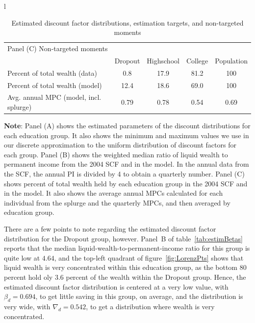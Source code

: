 \documentclass[\econtexRoot/EGMN]{subfiles}
\begin{document}
\begin{table}[tp]
\begin{center}
\begin{tabular}{l}
            \begin{tabular}{lcccc}
                \multicolumn{5}{l}{Panel (C) Non-targeted moments}                                   \\
                                                       & Dropout & Highschool & College & Population \\ \midrule
                Percent of total wealth (data)         & 0.8     & 17.9       & 81.2    & 100        \\
                Percent of total wealth (model)        & 12.4    & 18.6       & 69.0    & 100        \\
                Avg. annual MPC (model, incl. splurge) & 0.79    & 0.78       & 0.54    & 0.69
                \\ \bottomrule
            \end{tabular}
        \end{tabular}
        \caption{Estimated discount factor distributions, estimation targets, and non-targeted moments}
        \notinsubfile{\label{tab:estimBetas}}
        \parbox{16cm}{\small \vspace{.15cm} \textbf{Note}: Panel (A) shows the estimated parameters of the discount distributions for each education group. It also shows the minimum and maximum values we use in our discrete approximation to the uniform distribution of discount factors for each group. Panel (B) shows the weighted median ratio of liquid wealth to permanent income from the 2004 SCF and in the model. In the annual data from the SCF, the annual PI is divided by 4 to obtain a quarterly number. Panel (C) shows percent of total wealth held by each education group in the 2004 SCF and in the model. It also shows the average annual MPCs calculated for each individual from the splurge and the quarterly MPCs, and then averaged by education group.\normalsize}
    \end{center}
\end{table}

There are a few points to note regarding the estimated discount factor distribution for the Dropout group, however. Panel~B of table~\ref{tab:estimBetas} reports that the median liquid-wealth-to-permanent-income ratio for this group is quite low at $4.64$, and the top-left quadrant of figure~\ref{fig:LorenzPts} shows that liquid wealth is very concentrated within this education group, as the bottom 80 percent  hold oly $3.6$ percent of the wealth within the Dropout group. Hence, the estimated discount factor distribution is centered at a very low value, with $\beta_d=0.694$, to get little saving in this group, on average, and the distribution is very wide, with $\nabla_d=0.542$, to get a distribution where wealth is very concentrated.
\end{document}
